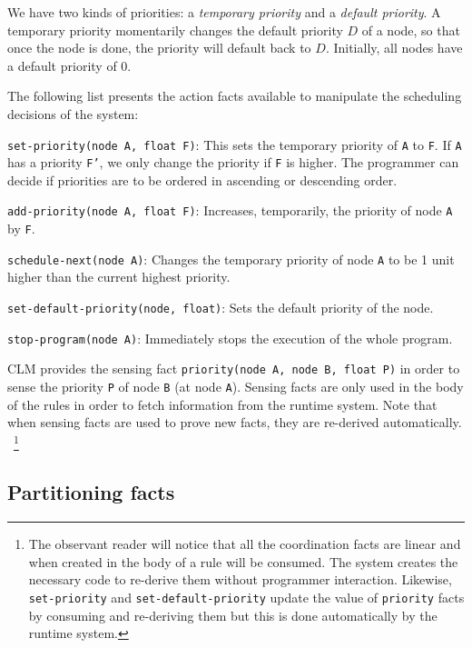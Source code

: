 We have two kinds of priorities: a \emph{temporary priority} and a \emph{default
priority}. A temporary priority momentarily changes the default priority $D$ of a
node, so that once the node is done, the priority will default back to $D$.
Initially, all nodes have a default priority of $0$.

The following list presents the action facts available to manipulate the scheduling
decisions of the system:

\newcommand{\code}[1]{\texttt{\small{#1}}}

\begin{tightitemize}
   \item \code{set-priority(node A, float F)}: This sets the
   temporary priority of \texttt{A} to \texttt{F}. If \texttt{A} has a priority
   \texttt{F'}, we only change the priority if \texttt{F} is higher. The programmer
   can decide if priorities are to be ordered in ascending or descending order.
   \item \code{add-priority(node A, float F)}: Increases,
   temporarily, the priority of node \texttt{A} by \texttt{F}.
   \item \code{schedule-next(node A)}: Changes the temporary priority of node
   \texttt{A} to be 1 unit higher than the current highest priority.
   \item \code{set-default-priority(node, float)}: Sets the default
   priority of the node.
   \item \code{stop-program(node A)}: Immediately stops the
   execution of the whole program.
\end{tightitemize}

CLM provides the sensing fact \code{priority(node A, node B, float P)} in order to sense the
priority \texttt{P} of node \texttt{B} (at node \texttt{A}).
Sensing facts are only used in the body of the rules in order
to fetch information from the runtime system.
Note that when sensing facts are used to prove new facts, they are re-derived automatically.
~\footnote{The observant reader will notice that all the coordination facts are
linear and when created in the body of a rule will be consumed. The system
creates the necessary code to re-derive them without programmer interaction.
Likewise, \texttt{set-priority} and \texttt{set-default-priority} update the
value of \texttt{priority} facts by consuming and re-deriving them but this is
done automatically by the runtime system.}

\subsection{Partitioning facts}

